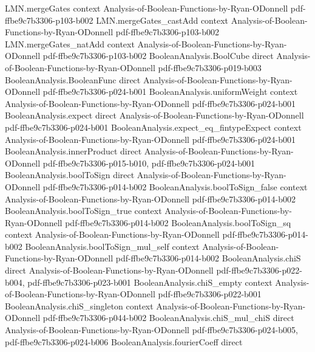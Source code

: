 \begin{theorem}
\proofstep
  {LMN.mergeGates}
  {context}
  {Analysis-of-Boolean-Functions-by-Ryan-ODonnell}
  {pdf-ffbe9c7b3306-p103-b002}
\proofstep
  {LMN.mergeGates_castAdd}
  {context}
  {Analysis-of-Boolean-Functions-by-Ryan-ODonnell}
  {pdf-ffbe9c7b3306-p103-b002}
\proofstep
  {LMN.mergeGates_natAdd}
  {context}
  {Analysis-of-Boolean-Functions-by-Ryan-ODonnell}
  {pdf-ffbe9c7b3306-p103-b002}
\proofstep
  {BooleanAnalysis.BoolCube}
  {direct}
  {Analysis-of-Boolean-Functions-by-Ryan-ODonnell}
  {pdf-ffbe9c7b3306-p019-b003}
\proofstep
  {BooleanAnalysis.BooleanFunc}
  {direct}
  {Analysis-of-Boolean-Functions-by-Ryan-ODonnell}
  {pdf-ffbe9c7b3306-p024-b001}
\proofstep
  {BooleanAnalysis.uniformWeight}
  {context}
  {Analysis-of-Boolean-Functions-by-Ryan-ODonnell}
  {pdf-ffbe9c7b3306-p024-b001}
\proofstep
  {BooleanAnalysis.expect}
  {direct}
  {Analysis-of-Boolean-Functions-by-Ryan-ODonnell}
  {pdf-ffbe9c7b3306-p024-b001}
\proofstep
  {BooleanAnalysis.expect_eq_fintypeExpect}
  {context}
  {Analysis-of-Boolean-Functions-by-Ryan-ODonnell}
  {pdf-ffbe9c7b3306-p024-b001}
\proofstep
  {BooleanAnalysis.innerProduct}
  {direct}
  {Analysis-of-Boolean-Functions-by-Ryan-ODonnell}
  {pdf-ffbe9c7b3306-p015-b010,
    pdf-ffbe9c7b3306-p024-b001}
\proofstep
  {BooleanAnalysis.boolToSign}
  {direct}
  {Analysis-of-Boolean-Functions-by-Ryan-ODonnell}
  {pdf-ffbe9c7b3306-p014-b002}
\proofstep
  {BooleanAnalysis.boolToSign_false}
  {context}
  {Analysis-of-Boolean-Functions-by-Ryan-ODonnell}
  {pdf-ffbe9c7b3306-p014-b002}
\proofstep
  {BooleanAnalysis.boolToSign_true}
  {context}
  {Analysis-of-Boolean-Functions-by-Ryan-ODonnell}
  {pdf-ffbe9c7b3306-p014-b002}
\proofstep
  {BooleanAnalysis.boolToSign_sq}
  {context}
  {Analysis-of-Boolean-Functions-by-Ryan-ODonnell}
  {pdf-ffbe9c7b3306-p014-b002}
\proofstep
  {BooleanAnalysis.boolToSign_mul_self}
  {context}
  {Analysis-of-Boolean-Functions-by-Ryan-ODonnell}
  {pdf-ffbe9c7b3306-p014-b002}
\proofstep
  {BooleanAnalysis.chiS}
  {direct}
  {Analysis-of-Boolean-Functions-by-Ryan-ODonnell}
  {pdf-ffbe9c7b3306-p022-b004,
    pdf-ffbe9c7b3306-p023-b001}
\proofstep
  {BooleanAnalysis.chiS_empty}
  {context}
  {Analysis-of-Boolean-Functions-by-Ryan-ODonnell}
  {pdf-ffbe9c7b3306-p022-b001}
\proofstep
  {BooleanAnalysis.chiS_singleton}
  {context}
  {Analysis-of-Boolean-Functions-by-Ryan-ODonnell}
  {pdf-ffbe9c7b3306-p044-b002}
\proofstep
  {BooleanAnalysis.chiS_mul_chiS}
  {direct}
  {Analysis-of-Boolean-Functions-by-Ryan-ODonnell}
  {pdf-ffbe9c7b3306-p024-b005,
    pdf-ffbe9c7b3306-p024-b006}
\proofstep
  {BooleanAnalysis.fourierCoeff}
  {direct}

\end{theorem}
